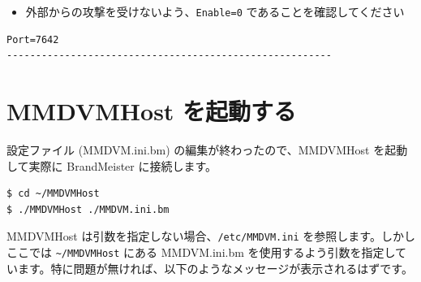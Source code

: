 \documentclass[a4j,oneside]{ujbook}
\begin{document}
\begin{itemize}
 \renewcommand{\labelitemi}{$\triangleright$}
 \item 外部からの攻撃を受けないよう、\verb+Enable=0+ であることを確認してください
\end{itemize}
\begin{verbatim}
Port=7642
--------------------------------------------------------
\end{verbatim}

\section{MMDVMHost を起動する}

設定ファイル (MMDVM.ini.bm) の編集が終わったので、MMDVMHost を起動して実際に BrandMeister に接続します。

\begin{verbatim}
$ cd ~/MMDVMHost
$ ./MMDVMHost ./MMDVM.ini.bm
\end{verbatim}

MMDVMHost は引数を指定しない場合、\verb+/etc/MMDVM.ini+ を参照します。しかしここでは \verb+~/MMDVMHost+ にある MMDVM.ini.bm を使用するよう引数を指定しています。特に問題が無ければ、以下のようなメッセージが表示されるはずです。
\end{document}
